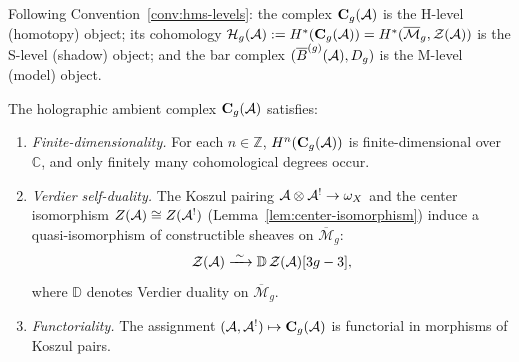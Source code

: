 \begin{remark}[H/M/S layers]\label{rem:thqg-III-hms}
Following Convention~\ref{conv:hms-levels}:
the complex $\mathbf{C}_g(\mathcal{A})$ is the H-level (homotopy)
object; its cohomology
$\mathcal{H}_g(\mathcal{A}) := H^*(\mathbf{C}_g(\mathcal{A}))
= H^*(\overline{\mathcal{M}}_g, \mathcal{Z}(\mathcal{A}))$
is the S-level (shadow) object; and the bar complex
$(\overline{B}^{(g)}(\mathcal{A}), D_{g})$ is the M-level (model) object.
\end{remark}

\begin{proposition}
\label{prop:thqg-III-ambient-properties}
The holographic ambient complex
$\mathbf{C}_g(\mathcal{A})$ satisfies:
\begin{enumerate}[label=\textup{(\roman*)}]
\item \emph{Finite-dimensionality.}
 For each $n \in \mathbb{Z}$,
 $H^n(\mathbf{C}_g(\mathcal{A}))$ is finite-dimensional over
 $\mathbb{C}$, and only finitely many cohomological degrees occur.

\item \emph{Verdier self-duality.}
 The Koszul pairing
 $\mathcal{A} \otimes \mathcal{A}^! \to \omega_X$ and the center isomorphism
 $Z(\mathcal{A}) \cong Z(\mathcal{A}^!)$
 (Lemma~\ref{lem:center-isomorphism}) induce a
 quasi-isomorphism of constructible sheaves on
 $\overline{\mathcal{M}}_g$:
 \begin{equation}\label{eq:thqg-III-verdier-self-duality}
 \mathcal{Z}(\mathcal{A})
 \xrightarrow{\;\sim\;}
 \mathbb{D}\,\mathcal{Z}(\mathcal{A})[3g - 3],
 \end{equation}
 where $\mathbb{D}$ denotes Verdier duality on
 $\overline{\mathcal{M}}_g$.

\item \emph{Functoriality.}
 The assignment $(\mathcal{A}, \mathcal{A}^!) \mapsto \mathbf{C}_g(\mathcal{A})$
 is functorial in morphisms of Koszul pairs.
\end{enumerate}
\end{proposition}

